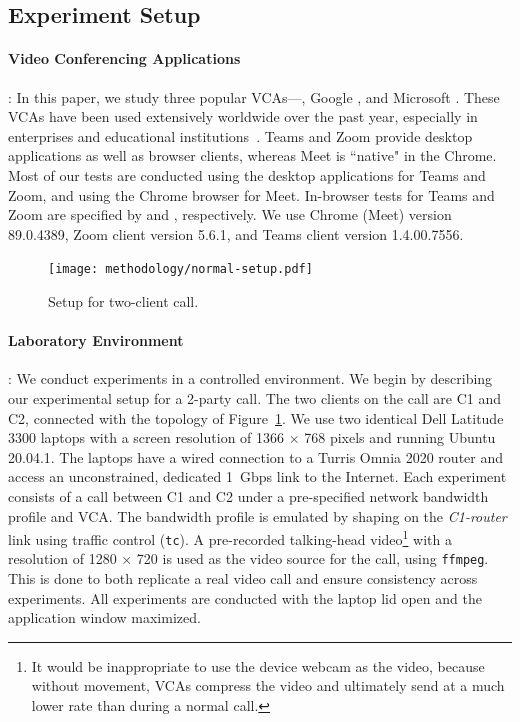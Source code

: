 \subsection{Experiment Setup} 
\label{subsec:setup}

\paragraph{Video Conferencing Applications}:
In this paper, we study three popular VCAs---\zoom, Google \meet, and Microsoft \teams.
These VCAs have been used extensively worldwide over the past year, especially
in enterprises and educational institutions~\cite{vca_share}.  Teams and Zoom
provide desktop applications as well as browser clients, whereas Meet is ``native"
in the Chrome. Most of our tests are conducted using the desktop
applications for Teams and Zoom, and using the Chrome browser for Meet.
In-browser tests for Teams and Zoom are specified by \textit{\teamsbrowser}
and \textit{\zoombrowser}, respectively. We use Chrome (Meet) version
89.0.4389, Zoom client version 5.6.1, and Teams client version 1.4.00.7556.



\begin{figure}[t]
\centering
\texttt{[image: methodology/normal-setup.pdf]}
\caption{Setup for two-client call.}
\label{fig:static_setup}
\end{figure}


\paragraph{Laboratory Environment}:
We conduct experiments in a controlled environment.  We begin by describing
our experimental setup for a 2-party call.  The two clients on the call are C1 and
C2, connected with the topology of Figure~\ref{fig:static_setup}.  We use two
identical Dell Latitude 3300 laptops with a screen resolution of 1366 $\times$
768 pixels and running Ubuntu 20.04.1. The laptops have a wired connection to
a Turris Omnia 2020 router and access an unconstrained, dedicated 1~Gbps link
to the Internet.  Each experiment consists of a call between C1 and C2 under a
pre-specified network bandwidth profile and VCA. The bandwidth profile is
emulated by shaping on the \textit{C1-router} link using traffic control
(\texttt{tc}). A pre-recorded talking-head video\footnote{It would be inappropriate to use the 
device webcam as the video, because without movement, VCAs compress the video
and ultimately send at a much lower rate than during a normal call.} with a
resolution of 1280 $\times$ 720 is used as the video source for the call, using \texttt{ffmpeg}.
This is done to both replicate a real video call and ensure consistency across
experiments. All experiments are conducted with the laptop lid open and the
application window maximized. 

